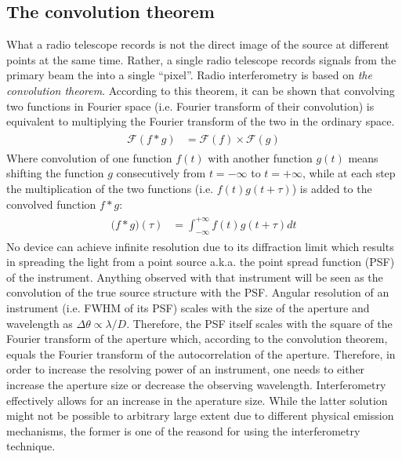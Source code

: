 \documentclass[a4wide,12pt]{book}
\begin{document}
{\subsection*{The convolution theorem}
What a radio telescope records is not the direct image of the source at different points at the same time. Rather, a single radio telescope records signals from the primary beam the into a single ``pixel''.  Radio interferometry is based on \emph{the convolution theorem}. According to this theorem, it can be shown that convolving two functions in Fourier space (i.e. Fourier transform of their convolution) is equivalent to multiplying the Fourier transform of the two in the ordinary space.
\begin{align} 
\begin{split}
\mathcal{F}(f*g) &= \mathcal{F}(f) \times \mathcal{F}(g)
\end{split}                    
\end{align}
Where convolution of one function $f(t)$ with another function $g(t)$ means shifting the function $g$ consecutively from $t=-\infty$ to $t=+\infty$, while at each step the multiplication of the two functions (i.e. $f(t)g(t+\tau)$) is added to the convolved function $f*g$:
\begin{align} 
\begin{split}
\mathcal (f*g)(\tau) &= \int_{-\infty}^{+\infty} f(t)g(t+\tau) dt
\end{split}                    
\end{align}
No device can achieve infinite resolution due to its diffraction limit which results in spreading the light from a point source a.k.a. the point spread function (PSF) of the instrument. Anything observed with that instrument will be seen as the convolution of the true source structure with the PSF. Angular resolution of an instrument (i.e. FWHM of its PSF) scales with the size of the aperture and wavelength as $\Delta\theta \propto \lambda / D$. Therefore, the PSF itself scales with the square of the Fourier transform of the aperture which, according to the convolution theorem, equals the Fourier transform of the autocorrelation of the aperture. Therefore, in order to increase the resolving power of an instrument, one needs to either increase the aperture size or decrease the observing wavelength.  Interferometry effectively allows for an increase in the aperature size. While the latter solution might not be possible to arbitrary large extent due to different physical emission mechanisms, the former is one of the reasond for using the interferometry technique.
 
}
\end{document}
